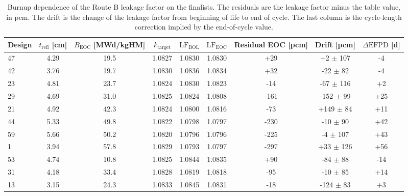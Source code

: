 \begin{table}[htbp]
  \centering
  \caption{Burnup dependence of the Route B leakage factor on the finalists. The residuals are the leakage factor minus the table value, in pcm. The drift is the change of the leakage factor from beginning of life to end of cycle. The last column is the cycle-length correction implied by the end-of-cycle value.}
  \label{tab:kt-burnup}
  \begin{tabular}{lcccccccc}
    \toprule
    Design & $t_\mathrm{refl}$ [cm] & $B_\mathrm{EOC}$ [MWd/kgHM] & $k_\mathrm{target}$ & $\mathrm{LF}_\mathrm{BOL}$ & $\mathrm{LF}_\mathrm{EOC}$ & Residual EOC [pcm] & Drift [pcm] & $\Delta\mathrm{EFPD}$ [d] \\
    \midrule
    47 & 4.29 & 19.5 & 1.0827 & 1.0830 & 1.0830 & +29 & +2 $\pm$ 107 & -4 \\
    42 & 3.76 & 19.7 & 1.0830 & 1.0836 & 1.0834 & +32 & -22 $\pm$ 82 & -4 \\
    23 & 4.81 & 23.7 & 1.0824 & 1.0830 & 1.0823 & -14 & -67 $\pm$ 116 & +2 \\
    29 & 4.69 & 31.0 & 1.0825 & 1.0824 & 1.0808 & -161 & -152 $\pm$ 99 & +25 \\
    21 & 4.92 & 42.3 & 1.0824 & 1.0800 & 1.0816 & -73 & +149 $\pm$ 84 & +11 \\
    44 & 5.33 & 49.8 & 1.0822 & 1.0798 & 1.0797 & -230 & -10 $\pm$ 90 & +42 \\
    59 & 5.66 & 50.2 & 1.0820 & 1.0796 & 1.0796 & -225 & -4 $\pm$ 107 & +43 \\
    1 & 3.94 & 57.8 & 1.0829 & 1.0793 & 1.0797 & -297 & +33 $\pm$ 126 & +56 \\
    53 & 4.74 & 10.8 & 1.0825 & 1.0844 & 1.0835 & +90 & -84 $\pm$ 88 & -14 \\
    31 & 4.18 & 33.4 & 1.0828 & 1.0819 & 1.0818 & -95 & -10 $\pm$ 85 & +14 \\
    13 & 3.15 & 24.3 & 1.0833 & 1.0845 & 1.0831 & -18 & -124 $\pm$ 83 & +3 \\
    \bottomrule
  \end{tabular}
\end{table}
